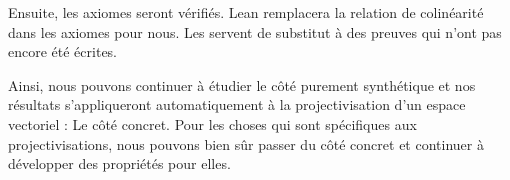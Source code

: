 \documentclass[12pt, oneside]{memoir}
\theoremstyle{definition}
\theoremstyle{remark}
\begin{document}
Ensuite, les axiomes seront vérifiés. Lean remplacera la relation de colinéarité
dans les axiomes pour nous. Les  servent de substitut à des preuves
qui n'ont pas encore été écrites.

Ainsi, nous pouvons continuer à étudier le côté purement synthétique et nos
résultats s'appliqueront automatiquement à la projectivisation d'un espace
vectoriel : Le côté concret. Pour les choses qui sont spécifiques aux
projectivisations, nous pouvons bien sûr passer du côté concret et continuer à
développer des propriétés pour elles.


\nocite{*}
\printbibliography[title=Références,heading=subbibliography]
\end{document}
